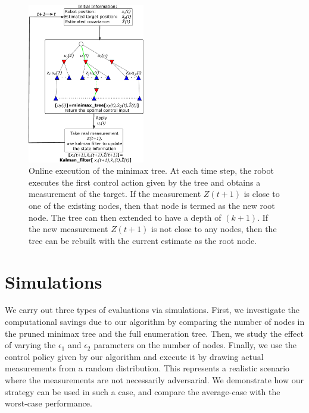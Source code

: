 \documentclass[journal]{IEEEtran}
\begin{document}
\begin{figure}
  \centering
  \includegraphics[height=7cm]{figs/simulation_step.eps}
  \caption{Online execution of the minimax tree. At each time step, the robot executes the first control action given by the tree and obtains a measurement of the target. If the measurement $Z(t+1)$ is close to one of the existing nodes, then that node is termed as the new root node. The tree can then extended to have a depth of $(k+1)$. If the new measurement $Z(t+1)$ is not close to any nodes, then the tree can be rebuilt with the current estimate as the root node.}
  \label{simulation_step}
\end{figure}






\section{Simulations} \label{sec:sims}
We carry out three types of evaluations via simulations. First, we investigate the computational savings due to our algorithm by comparing the number of nodes in the pruned minimax tree and the full enumeration tree. Then, we study the effect of varying the $\epsilon_1$ and $\epsilon_2$ parameters on the number of nodes. Finally, we use the control policy given by our algorithm and execute it by drawing actual measurements from a random distribution. This represents a realistic scenario where the measurements are not necessarily adversarial. We demonstrate how our strategy can be used in such a case, and compare the average-case with the worst-case performance.
\end{document}
